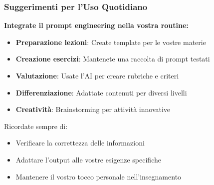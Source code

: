 \documentclass[aspectratio=169]{beamer}
\begin{document}
%
%
\begin{frame}
\frametitle{Suggerimenti per l'Uso Quotidiano}
\textbf{Integrate il prompt engineering nella vostra routine:}

\begin{itemize}[<+->]
    \item \textbf{Preparazione lezioni}: Create template per le vostre materie
    \item \textbf{Creazione esercizi}: Mantenete una raccolta di prompt testati
    \item \textbf{Valutazione}: Usate l'AI per creare rubriche e criteri
    \item \textbf{Differenziazione}: Adattate contenuti per diversi livelli
    \item \textbf{Creatività}: Brainstorming per attività innovative
\end{itemize}

\pause
\vspace{0.5cm}
\begin{warningbox}[Importante]
Ricordate sempre di:
\begin{itemize}
    \item Verificare la correttezza delle informazioni
    \item Adattare l'output alle vostre esigenze specifiche
    \item Mantenere il vostro tocco personale nell'insegnamento
\end{itemize}
\end{warningbox}
\end{frame}
%
\end{document}
